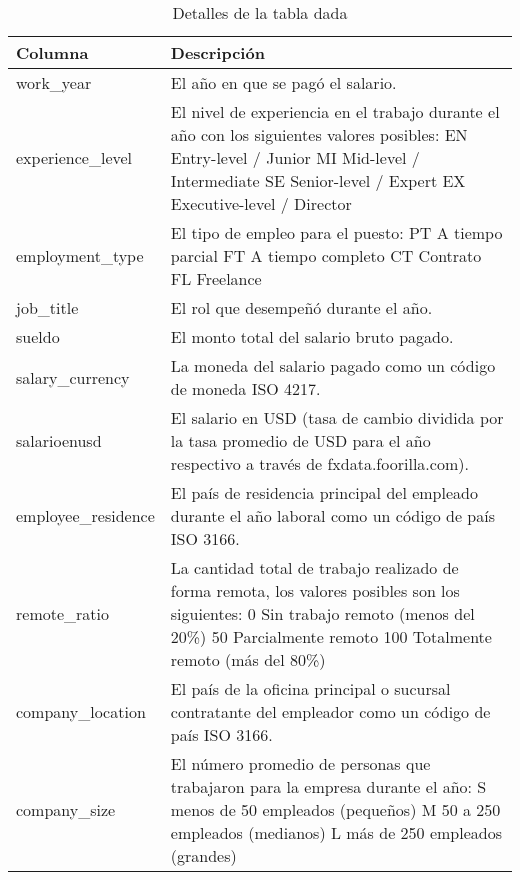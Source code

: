 \begin{table}[ht]
\centering
\begin{small}
\begin{tabular}{p{.3\linewidth}|p{.7\linewidth}}
Columna             & Descripción\\
\hline
work\_year          & El año en que se pagó el salario.\\
experience\_level   & El nivel de experiencia en el trabajo durante el año con los siguientes valores posibles: EN Entry-level / Junior MI Mid-level / Intermediate SE Senior-level / Expert EX Executive-level / Director\\
employment\_type    & El tipo de empleo para el puesto: PT A tiempo parcial FT A tiempo completo CT Contrato FL Freelance\\
job\_title          & El rol que desempe\~n\'o durante el año.\\
sueldo              & El monto total del salario bruto pagado.\\
salary\_currency    & La moneda del salario pagado como un código de moneda ISO 4217.\\
salarioenusd        & El salario en USD (tasa de cambio dividida por la tasa promedio de USD para el año respectivo a través de fxdata.foorilla.com).\\
employee\_residence & El país de residencia principal del empleado durante el año laboral como un código de país ISO 3166.\\
remote\_ratio       & La cantidad total de trabajo realizado de forma remota, los valores posibles son los siguientes: 0 Sin trabajo remoto (menos del 20\%) 50 Parcialmente remoto 100 Totalmente remoto (más del 80\%)\\
company\_location   & El país de la oficina principal o sucursal contratante del empleador como un código de país ISO 3166.\\
company\_size       & El número promedio de personas que trabajaron para la empresa durante el año: S menos de 50 empleados (pequeños) M 50 a 250 empleados (medianos) L más de 250 empleados (grandes)                    
\end{tabular}
\end{small}
\caption{Detalles de la tabla dada}
\label{table:detalle_csv}
\end{table}
